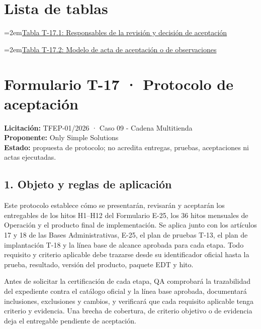 \documentclass[11pt]{article}
\begin{document}
\renewcommand{\tablename}{Tabla}
\renewcommand{\thetable}{T-17.\arabic{table}}

\tableofcontents
\clearpage
\section*{Lista de tablas}

\noindent\hangindent=2em\hyperref[tab:t17-1]{Tabla T-17.1: Responsables de la revisión y decisión de aceptación}\dotfill\pageref{tab:t17-1}\par\vspace{0.4\baselineskip}
\noindent\hangindent=2em\hyperref[tab:t17-2]{Tabla T-17.2: Modelo de acta de aceptación o de observaciones}\dotfill\pageref{tab:t17-2}\par\vspace{0.4\baselineskip}
\clearpage


\section{Formulario T-17 · Protocolo de aceptación}\label{t17-formulario-t-17-protocolo-de-aceptaciuxf3n}

\textbf{Licitación:} TFEP-01/2026 · Caso 09 - Cadena Multitienda\\
\textbf{Proponente:} Only Simple Solutions\\
\textbf{Estado:} propuesta de protocolo; no acredita entregas, pruebas, aceptaciones ni actas ejecutadas.

\subsection{1. Objeto y reglas de aplicación}\label{t17-objeto-y-reglas-de-aplicaciuxf3n}

Este protocolo establece cómo se presentarán, revisarán y aceptarán los entregables de los hitos H1--H12 del Formulario E-25, los 36 hitos mensuales de Operación y el producto final de implementación. Se aplica junto con los artículos 17 y 18 de las Bases Administrativas, E-25, el plan de pruebas T-13, el plan de implantación T-18 y la línea base de alcance aprobada para cada etapa. Todo requisito y criterio aplicable debe trazarse desde su identificador oficial hasta la prueba, resultado, versión del producto, paquete EDT y hito.

Antes de solicitar la certificación de cada etapa, QA comprobará la trazabilidad del expediente contra el catálogo oficial y la línea base aprobada, documentará inclusiones, exclusiones y cambios, y verificará que cada requisito aplicable tenga criterio y evidencia. Una brecha de cobertura, de criterio objetivo o de evidencia deja el entregable pendiente de aceptación.
\end{document}
